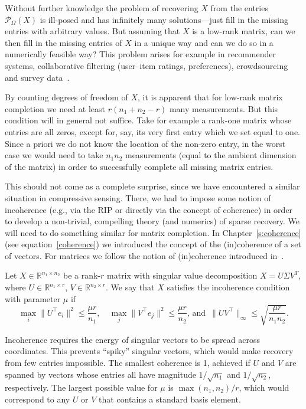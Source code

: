 Without further knowledge the problem of recovering $X$ from the entries $\mathcal{P}_\Omega(X)$ is ill-posed and has infinitely many solutions---just fill in the missing entries with arbitrary values. But assuming that  $X$ is a low-rank matrix, can we then fill in the missing entries of $X$ in a unique way and can we do so in a numerically feasible way? This problem arises for example in recommender systems, collaborative filtering (user–item ratings, preferences), crowdsourcing and survey data~\cite{koren2009matrix,WrightMa,agarwal2016statistical,udell2016generalized}.

By counting degrees of freedom of $X$, it is apparent that for low-rank matrix completion we need at least $r(n_1+n_2-r)$ many measurements. But this condition will in general not suffice. Take for example a rank-one matrix whose entries are all zeros, except for, say, its very first entry which we set equal to one. Since a priori we do not know the location of the non-zero entry, in the worst case we would need to take $n_1 n_2$ measurements (equal to the ambient dimension of the matrix) in order to successfully complete all missing matrix entries.

This should not come as a complete surprise, since we have encountered a similar situation in compressive sensing. There, we had to impose some notion of incoherence (e.g., via the RIP or directly via the concept of coherence) in order to develop a non-trivial, compelling theory (and numerics) of sparse recovery. We will need to do something similar for matrix completion.
In Chapter~\ref{s:coherence} (see equation~\eqref{coherence}) we introduced the concept of the (in)coherence of a set of vectors. For matrices we follow the notion of (in)coherence introduced in~\cite{CR08}. 

\begin{definition}\label{de:matrixcoherence}
    Let $X \in \mathbb{R}^{n_1 \times n_2}$ be a rank-$r$ matrix with  singular value decomposition $X = U \Sigma V^T$,
where $U \in \mathbb{R}^{n_1 \times r}$, $V \in \mathbb{R}^{n_2 \times r}$. We say that $X$ satisfies the incoherence condition with parameter $\mu$ if
$$\max_i \|U^\top e_i\|^2 \le \frac{\mu r}{n_1}, \quad \max_j \|V^\top e_j\|^2 \le \frac{\mu r}{n_2}, \,\text{and}\,\,\,
\|UV^\top\|_\infty \le \sqrt{\frac{\mu r}{n_1 n_2}}.$$
\end{definition}
Incoherence requires the energy of singular vectors to be spread across coordinates. This prevents ``spiky'' singular vectors, which would make recovery from few entries impossible.
The smallest coherence is 1, achieved if $U$ and $V$ are spanned by vectors whose entries all have magnitude 
$1/\sqrt{n_1}$ and $1/\sqrt{n_2}$, respectively.
The largest possible value for $\mu$ is $\max(n_1,n_2)/r$, 
which would correspond to any $U$ or $V$ that contains a standard basis element.







